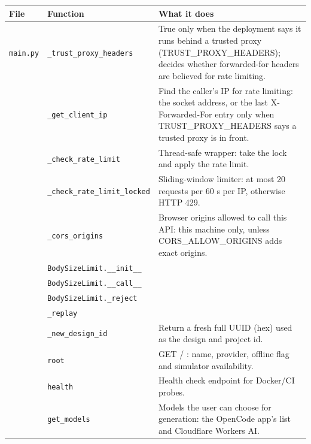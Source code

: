 \begin{longtable}{@{}p{2.8cm}>{\raggedright\arraybackslash}p{4.6cm}p{7.9cm}@{}}
\toprule \textbf{File} & \textbf{Function} & \textbf{What it does} \\ \midrule \endhead
\bottomrule \endfoot
{\small \nolinkurl{main.py}} & \texttt{\small \_\allowbreak{}trust\_\allowbreak{}proxy\_\allowbreak{}headers} & True only when the deployment says it runs behind a trusted proxy (TRUST\_PROXY\_HEADERS); decides whether forwarded-for headers are believed for rate limiting. \\
{\small } & \texttt{\small \_\allowbreak{}get\_\allowbreak{}client\_\allowbreak{}ip} & Find the caller's IP for rate limiting: the socket address, or the last X-Forwarded-For entry only when TRUST\_PROXY\_HEADERS says a trusted proxy is in front. \\
{\small } & \texttt{\small \_\allowbreak{}check\_\allowbreak{}rate\_\allowbreak{}limit} & Thread-safe wrapper: take the lock and apply the rate limit. \\
{\small } & \texttt{\small \_\allowbreak{}check\_\allowbreak{}rate\_\allowbreak{}limit\_\allowbreak{}locked} & Sliding-window limiter: at most 20 requests per 60 s per IP, otherwise HTTP 429. \\
{\small } & \texttt{\small \_\allowbreak{}cors\_\allowbreak{}origins} & Browser origins allowed to call this API: this machine only, unless CORS\_ALLOW\_ORIGINS adds exact origins. \\
{\small } & \texttt{\small BodySizeLimit.\allowbreak \_\allowbreak{}\_\allowbreak{}init\_\allowbreak{}\_\allowbreak{}} &  \\
{\small } & \texttt{\small BodySizeLimit.\allowbreak \_\allowbreak{}\_\allowbreak{}call\_\allowbreak{}\_\allowbreak{}} &  \\
{\small } & \texttt{\small BodySizeLimit.\allowbreak \_\allowbreak{}reject} &  \\
{\small } & \texttt{\small \_\allowbreak{}replay} &  \\
{\small } & \texttt{\small \_\allowbreak{}new\_\allowbreak{}design\_\allowbreak{}id} & Return a fresh full UUID (hex) used as the design and project id. \\
{\small } & \texttt{\small root} & GET / : name, provider, offline flag and simulator availability. \\
{\small } & \texttt{\small health} & Health check endpoint for Docker/CI probes. \\
{\small } & \texttt{\small get\_\allowbreak{}models} & Models the user can choose for generation: the OpenCode app's list and Cloudflare Workers AI. \\

\end{longtable}
